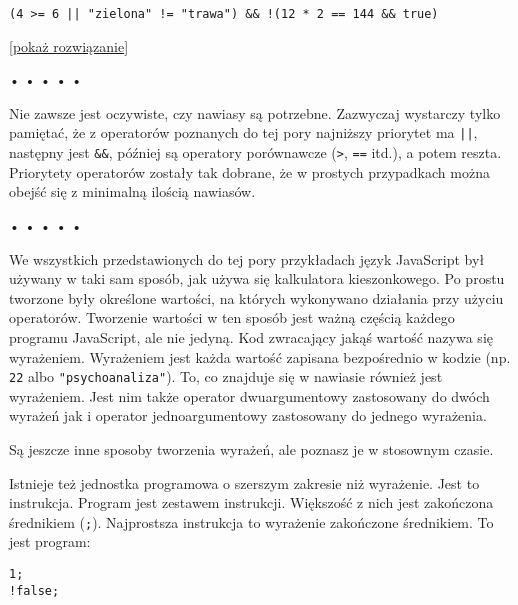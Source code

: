 \begin{verbatim} 
(4 >= 6 || "zielona" != "trawa") && !(12 * 2 == 144 && true)
\end{verbatim}
    
[\hyperref[sol:2.1]{pokaż rozwiązanie}]
    
    
  
\begin{center}
• • • • •
\end{center}
  
    
Nie zawsze jest oczywiste, czy nawiasy są potrzebne. Zazwyczaj wystarczy tylko pamiętać, że z operatorów poznanych do tej pory najniższy priorytet ma \texttt{||}, następny jest \texttt{\&\&}, później są operatory porównawcze (\texttt{>}, \texttt{==} itd.), a potem reszta. Priorytety operatorów zostały tak dobrane, że w prostych przypadkach można obejść się z minimalną ilością nawiasów.

  
\begin{center}
• • • • •
\end{center}
  
    
We wszystkich przedstawionych do tej pory przykładach język JavaScript był używany w taki sam sposób, jak używa się kalkulatora kieszonkowego. Po prostu tworzone były określone wartości, na których wykonywano działania przy użyciu operatorów. Tworzenie wartości w ten sposób jest ważną częścią każdego programu JavaScript, ale nie jedyną. Kod zwracający jakąś wartość nazywa się wyrażeniem. Wyrażeniem jest każda wartość zapisana bezpośrednio w kodzie (np. \texttt{22} albo \texttt{"psychoanaliza"}). To, co znajduje się w nawiasie również jest wyrażeniem. Jest nim także operator dwuargumentowy zastosowany do dwóch wyrażeń jak i operator jednoargumentowy zastosowany do jednego wyrażenia.

    
Są jeszcze inne sposoby tworzenia wyrażeń, ale poznasz je w stosownym czasie.

    
Istnieje też jednostka programowa o szerszym zakresie niż wyrażenie. Jest to instrukcja. Program jest zestawem instrukcji. Większość z nich jest zakończona średnikiem (\texttt{;}). Najprostsza instrukcja to wyrażenie zakończone średnikiem. To jest program:

\begin{verbatim} 
1;
!false;
\end{verbatim}
    
